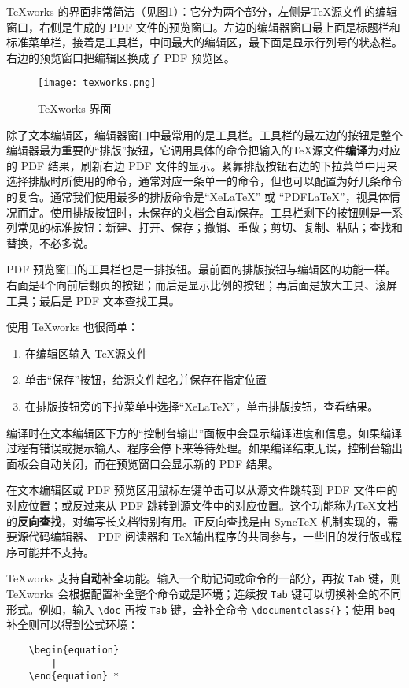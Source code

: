TeXworks 的界面非常简洁（见图\ref{fig:2}）：它分为两个部分，左侧是\TeX 源文件的编辑窗口，右侧是生成的 PDF 文件的预览窗口。左边的编辑器窗口最上面是标题栏和标准菜单栏，接着是工具栏，中间最大的编辑区，最下面是显示行列号的状态栏。右边的预览窗口把编辑区换成了 PDF 预览区。

\begin{figure}[H]
    \centering
    \texttt{[image: texworks.png]}
    \caption{TeXworks 界面}
    \label{fig:2}
\end{figure}

除了文本编辑区，编辑器窗口中最常用的是工具栏。工具栏的最左边的按钮是整个编辑器最为重要的“排版”按钮，它调用具体的命令把输入的\TeX 源文件\textbf{编译}为对应的 PDF 结果，刷新右边 PDF 文件的显示。紧靠排版按钮右边的下拉菜单中用来选择排版时所使用的命令，通常对应一条单一的命令，但也可以配置为好几条命令的复合。通常我们使用最多的排版命令是“XeLaTeX” 或 “PDFLaTeX”，视具体情况而定。使用排版按钮时，未保存的文档会自动保存。工具栏剩下的按钮则是一系列常见的标准按钮：新建、打开、保存；撤销、重做；剪切、复制、粘贴；查找和替换，不必多说。

PDF 预览窗口的工具栏也是一排按钮。最前面的排版按钮与编辑区的功能一样。右面是4个向前后翻页的按钮；而后是显示比例的按钮；再后面是放大工具、滚屏工具；最后是 PDF 文本查找工具。

使用 TeXworks 也很简单：

\begin{enumerate}
    \item 在编辑区输入 \TeX 源文件
    \item 单击“保存”按钮，给源文件起名并保存在指定位置
    \item 在排版按钮旁的下拉菜单中选择“XeLaTeX”，单击排版按钮，查看结果。
\end{enumerate}

编译时在文本编辑区下方的“控制台输出”面板中会显示编译进度和信息。如果编译过程有错误或提示输入、程序会停下来等待处理。如果编译结束无误，控制台输出面板会自动关闭，而在预览窗口会显示新的 PDF 结果。

在文本编辑区或 PDF 预览区用鼠标左键单击可以从源文件跳转到 PDF 文件中的对应位置；或反过来从 PDF 跳转到源文件中的对应位置。这个功能称为\TeX 文档的\textbf{反向查找}，对编写长文档特别有用。正反向查找是由 SyncTeX 机制实现的，需要源代码编辑器、 PDF 阅读器和 \TeX 输出程序的共同参与，一些旧的发行版或程序可能并不支持。

TeXworks 支持\textbf{自动补全}功能。输入一个助记词或命令的一部分，再按 \verb|Tab| 键，则 TeXworks 会根据配置补全整个命令或是环境；连续按 \verb|Tab| 键可以切换补全的不同形式。例如，输入 \verb|\doc| 再按 \verb|Tab| 键，会补全命令 \verb|\documentclass{}|；使用 \verb|beq| 补全则可以得到公式环境：
\begin{lstlisting}
    \begin{equation}
        |
    \end{equation} *
\end{lstlisting}

